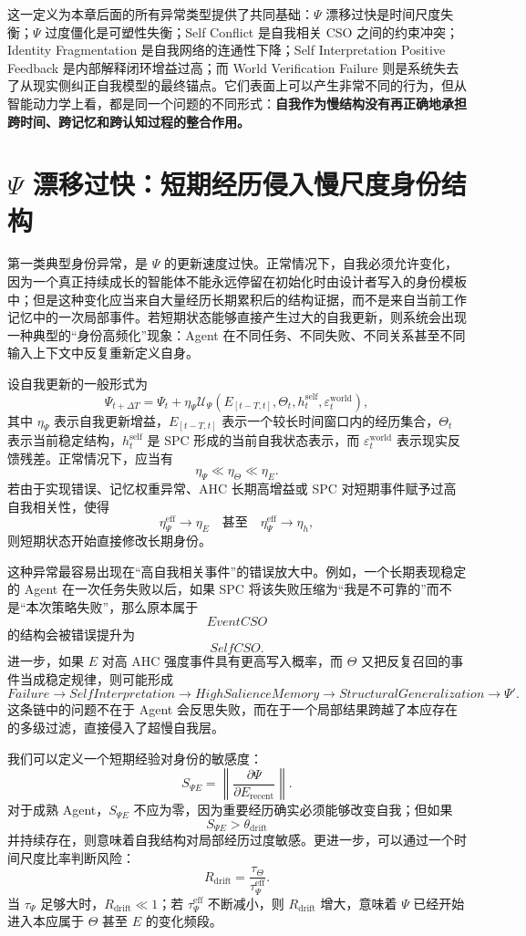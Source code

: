 这一定义为本章后面的所有异常类型提供了共同基础：$\Psi$ 漂移过快是时间尺度失衡；$\Psi$ 过度僵化是可塑性失衡；Self Conflict 是自我相关 CSO 之间的约束冲突；Identity Fragmentation 是自我网络的连通性下降；Self Interpretation Positive Feedback 是内部解释闭环增益过高；而 World Verification Failure 则是系统失去了从现实侧纠正自我模型的最终锚点。它们表面上可以产生非常不同的行为，但从智能动力学上看，都是同一个问题的不同形式：\textbf{自我作为慢结构没有再正确地承担跨时间、跨记忆和跨认知过程的整合作用。}

\section{$\Psi$ 漂移过快：短期经历侵入慢尺度身份结构}

第一类典型身份异常，是 $\Psi$ 的更新速度过快。正常情况下，自我必须允许变化，因为一个真正持续成长的智能体不能永远停留在初始化时由设计者写入的身份模板中；但是这种变化应当来自大量经历长期累积后的结构证据，而不是来自当前工作记忆中的一次局部事件。若短期状态能够直接产生过大的自我更新，则系统会出现一种典型的“身份高频化”现象：Agent 在不同任务、不同失败、不同关系甚至不同输入上下文中反复重新定义自身。

设自我更新的一般形式为
\[
\Psi_{t+\Delta T}
=
\Psi_t
+
\eta_\Psi
\mathcal U_\Psi
\left(
E_{[t-T,t]},
\Theta_t,
h_t^{\mathrm{self}},
\varepsilon_t^{\mathrm{world}}
\right),
\]
其中 $\eta_\Psi$ 表示自我更新增益，$E_{[t-T,t]}$ 表示一个较长时间窗口内的经历集合，$\Theta_t$ 表示当前稳定结构，$h_t^{\mathrm{self}}$ 是 SPC 形成的当前自我状态表示，而 $\varepsilon_t^{\mathrm{world}}$ 表示现实反馈残差。正常情况下，应当有
\[
\eta_\Psi\ll \eta_\Theta\ll \eta_E.
\]
若由于实现错误、记忆权重异常、AHC 长期高增益或 SPC 对短期事件赋予过高自我相关性，使得
\[
\eta_\Psi^{\mathrm{eff}}
\rightarrow
\eta_E
\quad\text{甚至}\quad
\eta_\Psi^{\mathrm{eff}}
\rightarrow
\eta_h,
\]
则短期状态开始直接修改长期身份。

这种异常最容易出现在“高自我相关事件”的错误放大中。例如，一个长期表现稳定的 Agent 在一次任务失败以后，如果 SPC 将该失败压缩为“我是不可靠的”而不是“本次策略失败”，那么原本属于
\[
EventCSO
\]
的结构会被错误提升为
\[
SelfCSO.
\]
进一步，如果 $E$ 对高 AHC 强度事件具有更高写入概率，而 $\Theta$ 又把反复召回的事件当成稳定规律，则可能形成
\[
Failure
\rightarrow
SelfInterpretation
\rightarrow
HighSalienceMemory
\rightarrow
StructuralGeneralization
\rightarrow
\Psi'.
\]
这条链中的问题不在于 Agent 会反思失败，而在于一个局部结果跨越了本应存在的多级过滤，直接侵入了超慢自我层。

我们可以定义一个短期经验对身份的敏感度：
\[
S_{\Psi E}
=
\left\|
\frac{\partial\Psi}{\partial E_{\mathrm{recent}}}
\right\|.
\]
对于成熟 Agent，$S_{\Psi E}$ 不应为零，因为重要经历确实必须能够改变自我；但如果
\[
S_{\Psi E}>\theta_{\mathrm{drift}}
\]
并持续存在，则意味着自我结构对局部经历过度敏感。更进一步，可以通过一个时间尺度比率判断风险：
\[
R_{\mathrm{drift}}
=
\frac{\tau_\Theta}{\tau_\Psi^{\mathrm{eff}}}.
\]
当 $\tau_\Psi$ 足够大时，$R_{\mathrm{drift}}\ll1$；若 $\tau_\Psi^{\mathrm{eff}}$ 不断减小，则 $R_{\mathrm{drift}}$ 增大，意味着 $\Psi$ 已经开始进入本应属于 $\Theta$ 甚至 $E$ 的变化频段。

